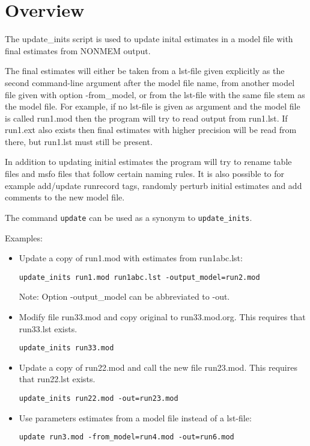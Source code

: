 
\setlength{\evensidemargin}{0pt}
\setlength{\oddsidemargin}{0pt}




\maketitle


\section{Overview}
The update\_inits script is used to update inital estimates in a model file with final
estimates from NONMEM output.

The final estimates will either be taken from a lst-file given explicitly as the second 
command-line argument after the model file name, from another model file given with option -from\_model, 
or from the lst-file with the same file stem as the model file.
For example, if no lst-file is given as argument and the model file is called run1.mod then the program will try to read output from
run1.lst. If run1.ext also exists then final estimates with higher precision will be read from there, 
but run1.lst must still be present.

In addition to updating initial estimates the program will try to rename table files and
msfo files that follow certain naming rules. It is also possible to for example
add/update runrecord tags,
randomly perturb initial estimates and add comments to the new model file.

The command \verb|update| can be used as a synonym to \verb|update_inits|.

\noindent Examples:
\begin{itemize}
\item Update a copy of run1.mod with estimates from run1abc.lst:
\begin{verbatim}
update_inits run1.mod run1abc.lst -output_model=run2.mod
\end{verbatim}
Note: Option -output\_model can be abbreviated to -out.
\item Modify file run33.mod and copy original to run33.mod.org. This requires that run33.lst exists.
\begin{verbatim}
update_inits run33.mod
\end{verbatim}
\item Update a copy of run22.mod and call the new file run23.mod. This requires that run22.lst exists.
\begin{verbatim}
update_inits run22.mod -out=run23.mod
\end{verbatim}
\item Use parameters estimates from a model file instead of a lst-file:
\begin{verbatim}
update run3.mod -from_model=run4.mod -out=run6.mod
\end{verbatim}
\end{itemize}

